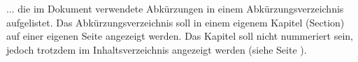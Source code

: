 
... die im Dokument verwendete Abkürzungen in einem Abkürzungsverzeichnis aufgelistet. Das Abkürzungsverzeichnis soll in einem eigenem Kapitel (Section) auf einer eigenen Seite angezeigt werden. Das Kapitel soll nicht nummeriert sein, jedoch trotzdem im Inhaltsverzeichnis angezeigt werden (siehe Seite \pageref{toc}).
